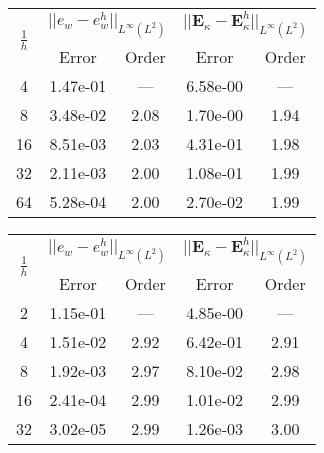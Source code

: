 \begin{table}[hp]
	\centering
	\begin{tabular}{ccccc}
		\hline 
		\multirow{2}{*}{$\frac{1}{h}$} & \multicolumn{2}{c}{$||e_w - e_w^h||_{L^{\infty}(L^2)}$}  & \multicolumn{2}{c}{$||\bm{E}_\kappa - \bm{E}_\kappa^h||_{L^{\infty}(L^2)}$}   \\ 
		& Error & Order  & Error & Order  \\
		\hline 
		4  & 1.47e-01 & ---  & 6.58e-00 & ---  \\ 
		8  & 3.48e-02 & 2.08 & 1.70e-00 & 1.94 \\ 
		16 & 8.51e-03 & 2.03 & 4.31e-01 & 1.98 \\ 
		32 & 2.11e-03 & 2.00 & 1.08e-01 & 1.99 \\ 
		64 & 5.28e-04 & 2.00 & 2.70e-02 & 1.99 \\ 
		\hline 
	\end{tabular} 
	\captionsetup{width=0.95\linewidth}
	\vspace{1mm}
	\label{tab:resminHHJ_SSSS_k2}
\end{table}

\begin{table}[hp]
	\centering
	\begin{tabular}{ccccc}
		\hline 
		\multirow{2}{*}{$\frac{1}{h}$} & \multicolumn{2}{c}{$||e_w - e_w^h||_{L^{\infty}(L^2)}$}  & \multicolumn{2}{c}{$||\bm{E}_\kappa - \bm{E}_\kappa^h||_{L^{\infty}(L^2)}$}   \\ 
		& Error & Order  & Error & Order  \\
		\hline 
		2  & 1.15e-01 & ---  & 4.85e-00 & ---  \\ 
		4  & 1.51e-02 & 2.92 & 6.42e-01 & 2.91 \\ 
		8  & 1.92e-03 & 2.97 & 8.10e-02 & 2.98 \\ 
		16 & 2.41e-04 & 2.99 & 1.01e-02 & 2.99 \\ 
		32 & 3.02e-05 & 2.99 & 1.26e-03 & 3.00 \\ 
		\hline 
	\end{tabular} 
	\captionsetup{width=0.95\linewidth}
	\vspace{1mm}
	\label{tab:resminHHJ_SSSS_k3}
\end{table}


